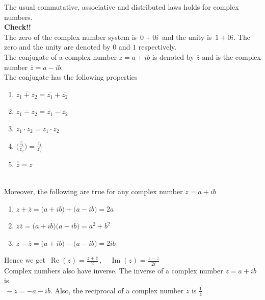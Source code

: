 \documentclass[11pt,a4paper]{article}
\theoremstyle{definition}
\begin{document}
The usual commutative, associative and distributed laws holds for complex numbers.\\
\textbf{Check!!}\\


The zero of the complex number system is $\, 0 + 0i\,$ and the unity is $\, 1 + 0i$. The zero and the unity are denoted by  $0$ and $1$ respectively.\\


The conjugate of a complex number $z = a + ib$ is denoted by $\overline{z}$ and is the complex number $\overline{z} = a - ib$.\\

The conjugate has the following properties
\begin{enumerate}
\item[i).] $\overline{z_1 + z_2} = \overline{z_1} + \overline{z_2}$
\item[ii).] $\overline{z_1 - z_2} = \overline{z_1} - \overline{z_2}$
\item[iii).] $\overline{z_1 \cdot z_2} = \overline{z_1} \cdot \overline{z_2}$

\item[iv).]$\overline{\Bigg(\frac{z_1}{z_2}\Bigg)} = \frac{\overline{z_1}}{\overline{z_2}}$

\item[v).] $\overline{\overline{z}} = z$\\\\
\end{enumerate}






Moreover, the following are true for any complex number $z = a + ib$
\begin{enumerate}
\item[i).] $z + \overline{z} = \big( a + ib\big) + \big( a - ib\big)= 2a$
\item[ii).] $z\overline{z} = \big( a + ib\big)\big( a - ib\big) = a^2 + b^2$
\item[iii).] $z - \overline{z}  = \big( a + ib\big) - \big( a - ib\big) = 2ib$
\end{enumerate}

Hence we get $\,\operatorname{Re}(z) = \frac{z + \overline{z}}{2}\,, \quad  \operatorname{Im} (z) = \frac{z - \overline{z}}{2i}$\\


Complex numbers also have inverse. The inverse of a complex number $z =  a + ib\,$ is\\ $\,-z =  - a - ib$. Also, the reciprocal of a complex number $z$ is $\frac{1}{z}$\\
\end{document}
